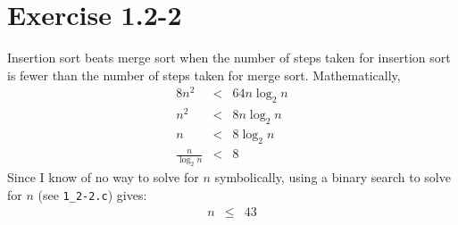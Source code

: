 \documentclass{article}
\begin{document}
\section*{Exercise 1.2-2}

Insertion sort beats merge sort when the number of steps taken for insertion sort is fewer than the number of steps taken for merge sort. Mathematically,
\begin{eqnarray*}
	8 n^2 & < & 64 n \log_2 n \\
	n^2 & < & 8 n \log_2 n \\
	n & < & 8 \log_2 n \\
	\frac{n}{\log_2 n} & < & 8
\end{eqnarray*}
Since I know of no way to solve for $n$ symbolically, using a binary search to solve for $n$ (see \texttt{1\_2-2.c}) gives:
\begin{eqnarray*}
	n & \leq & 43
\end{eqnarray*}
\end{document}
